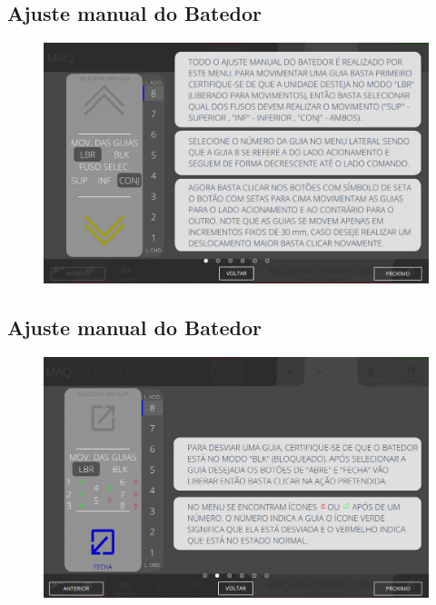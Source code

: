 
\thispagestyle{fancy}
\vspace{\fill}
\subsection{Ajuste manual do Batedor}
\begin{figure}
    \centering
    \includegraphics[width=480 px,height=300 px]{src/imagesICV/07-scout/commands/1.png}
\end{figure}
\newpage

\thispagestyle{fancy}
\vspace{\fill}
\subsection{Ajuste manual do Batedor}
\begin{figure}
    \centering
    \includegraphics[width=576 px,height=360 px]{src/imagesICV/07-scout/commands/2.png}
\end{figure}

